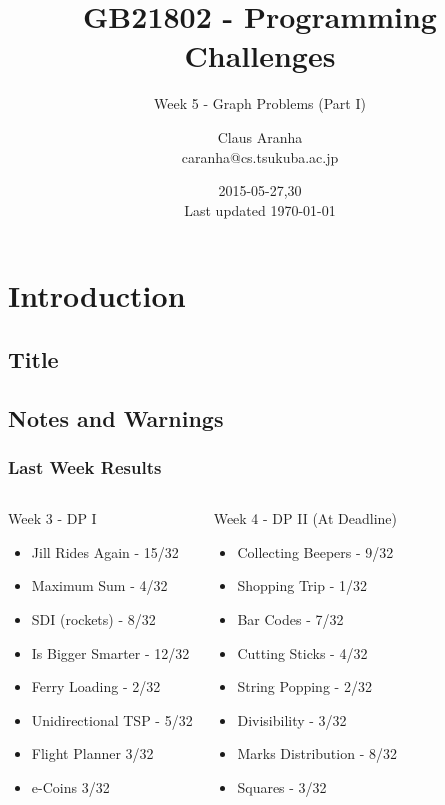 \documentclass{beamer}
\title[GB21802]{GB21802 - Programming Challenges}
\subtitle[]{Week 5 - Graph Problems (Part I)}
\author[Claus Aranha]{Claus Aranha\\{\footnotesize caranha@cs.tsukuba.ac.jp}}
\institute{College of Information Science}
\date{2015-05-27,30\\{\tiny Last updated \today}}
\begin{document}
\section{Introduction}
\subsection{Title}
\begin{frame}
\maketitle
\end{frame}

\subsection{Notes and Warnings}

\begin{frame}
  \frametitle{Last Week Results}
  \begin{columns}[T]
    \begin{block}{Week 3 - DP I}
      \begin{itemize}
      \item Jill Rides Again - 15/32
      \item Maximum Sum - 4/32
      \item SDI (rockets) - 8/32
      \item Is Bigger Smarter - 12/32
      \item Ferry Loading - 2/32
      \item Unidirectional TSP - 5/32
      \item Flight Planner 3/32
      \item e-Coins 3/32
      \end{itemize}
    \end{block}
    \begin{block}{Week 4 - DP II (At Deadline)} 
      \begin{itemize}
      \item Collecting Beepers - 9/32
      \item Shopping Trip - 1/32
      \item Bar Codes - 7/32
      \item Cutting Sticks - 4/32
      \item String Popping - 2/32
      \item Divisibility - 3/32
      \item Marks Distribution - 8/32
      \item Squares - 3/32
      \end{itemize}
    \end{block}
  \end{columns}
\end{frame}
\end{document}

